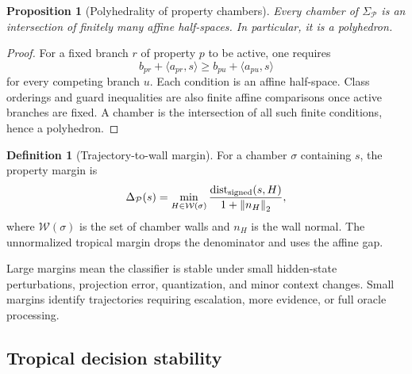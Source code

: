 \documentclass[11pt]{article}
\newtheorem{proposition}[theorem]{Proposition}
\theoremstyle{definition}
\newtheorem{definition}[theorem]{Definition}
\theoremstyle{remark}
\newcommand{\Prop}{\mathcal{P}}
\newcommand{\norm}[1]{\left\lVert #1\right\rVert}
\numberwithin{equation}{section}
\begin{document}
\begin{proposition}[Polyhedrality of property chambers]
Every chamber of \(\Sigma_{\Prop}\) is an intersection of finitely many affine half-spaces.  In particular, it is a polyhedron.
\end{proposition}
\begin{proof}
For a fixed branch \(r\) of property \(p\) to be active, one requires
\begin{equation}
    b_{pr}+\langle a_{pr},s\rangle\ge b_{pu}+\langle a_{pu},s\rangle
\end{equation}
for every competing branch \(u\).  Each condition is an affine half-space.  Class orderings and guard inequalities are also finite affine comparisons once active branches are fixed.  A chamber is the intersection of all such finite conditions, hence a polyhedron.
\end{proof}

\begin{definition}[Trajectory-to-wall margin]
For a chamber \(\sigma\) containing \(s\), the property margin is
\begin{equation}
    \Delta_{\Prop}(s)=\min_{H\in\mathcal W(\sigma)} \frac{\operatorname{dist}_{\rm signed}(s,H)}{1+\norm{n_H}_2},
\end{equation}
where \(\mathcal W(\sigma)\) is the set of chamber walls and \(n_H\) is the wall normal.  The unnormalized tropical margin drops the denominator and uses the affine gap.
\end{definition}

Large margins mean the classifier is stable under small hidden-state perturbations, projection error, quantization, and minor context changes.  Small margins identify trajectories requiring escalation, more evidence, or full oracle processing.

\subsection{Tropical decision stability}
\end{document}
